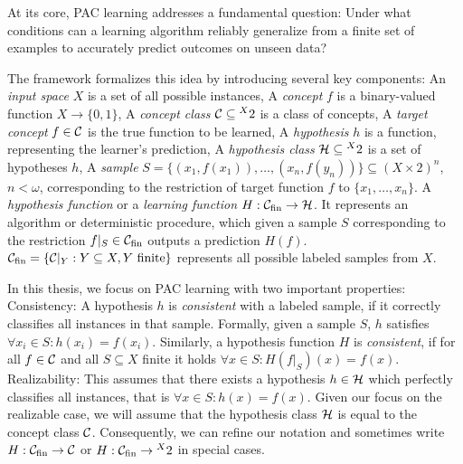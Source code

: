 At its core, PAC learning addresses a fundamental question: Under what conditions can a learning algorithm reliably generalize from a finite set of examples to accurately predict outcomes on unseen data? 

\begin{definition}
\begin{outline}
\0 The framework formalizes this idea by introducing several key components:
    \1 An \emph{input space} $X$ is a set of all possible instances,
    \1 A \emph{concept} $f$ is a binary-valued function $X\rightarrow\{0,1\}$,
    \1 A \emph{concept class} $\mathcal{C}\subseteq \prescript{X}{}{2}$ is a class of concepts,
    \1 A \emph{target concept} $f\in\mathcal{C}$ is the true function to be learned,
    \1 A \emph{hypothesis} $h$ is a function, representing the learner's prediction,
    \1 A \emph{hypothesis class} $\mathcal{H}\subseteq \prescript{X}{}{2}$ is a set of hypotheses $h$,
    \1 A \emph{sample} $S=\{(x_1,f(x_1)),\ldots,(x_n,f(y_n))\}\subseteq (X\times 2)^n$, $n<\omega$, corresponding to the restriction of target function $f$ to $\{x_1,\ldots,x_n\}$. 
    \1 A \emph{hypothesis function} or a \emph{learning function} $H:\mathcal{C}_{\text{fin}} \rightarrow \mathcal{H}$. It represents an algorithm or deterministic procedure, which given a sample $S$ corresponding to the restriction $f|_S\in\mathcal{C}_{\text{fin}}$ outputs a prediction $H(f)$.
        \2 $\mathcal{C}_{\text{fin}} = \{\mathcal{C}|_Y : Y\subseteq X, Y\text{ finite}\}$ represents all possible labeled samples from $X$.   
\end{outline}
\end{definition}

\begin{remark}[Restrictions]
\label{remark:consistentRealizable}
\begin{outline}     
\0 In this thesis, we focus on PAC learning with two important properties:
    \1 Consistency: A hypothesis $h$ is \emph{consistent} with a labeled sample, if it correctly classifies all instances in that sample. Formally, given a sample $S$, $h$ satisfies $\forall x_i \in S : h(x_i)=f(x_i)$. Similarly, a hypothesis function $H$ is \emph{consistent}, if for all $f\in\mathcal{C}$ and all $S\subseteq X$ finite it holds $\forall x\in S : H(f|_S)(x)=f(x)$. 
    \1 Realizability: This assumes that there exists a hypothesis $h\in\mathcal{H}$ which perfectly classifies all instances, that is $\forall x\in S : h(x)=f(x)$. 
\0 Given our focus on the realizable case, we will assume that the hypothesis class $\mathcal{H}$ is equal to the concept class $\mathcal{C}$. Consequently, we can refine our notation and sometimes write $H:\mathcal{C}_{\text{fin}} \rightarrow \mathcal{C}$ or $H:\mathcal{C}_{\text{fin}} \rightarrow \prescript{X}{}{2}$ in special cases.
\end{outline}
\end{remark}

